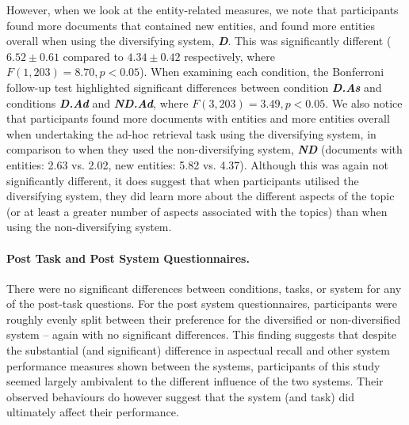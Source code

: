 However, when we look at the entity-related measures, we note that participants found more documents that contained new entities, and found more entities overall when using the diversifying system, \textbf{\emph{D}}. This was significantly different ($6.52\pm0.61$ compared to $4.34\pm0.42$ respectively, where $F(1, 203)=8.70, p<0.05$). When examining each condition, the Bonferroni follow-up test highlighted significant differences between condition \textbf{\emph{D.As}} and conditions \textbf{\emph{D.Ad}} and \textbf{\emph{ND.Ad}}, where $F(3, 203)=3.49, p<0.05$. We also notice that participants found more documents with entities and more entities overall when undertaking the ad-hoc retrieval task using the diversifying system, in comparison to when they used the non-diversifying system, \textbf{\emph{ND}} (documents with entities: 2.63 vs. 2.02, new entities: 5.82 vs. 4.37). Although this was again not significantly different, it does suggest that when participants utilised the diversifying system, they did learn more about the different aspects of the topic (or at least a greater number of aspects associated with the topics) than when using the non-diversifying system. 

\paragraph{Post Task and Post System Questionnaires.} There were no significant differences between conditions, tasks, or system for any of the post-task questions. For the post system questionnaires, participants were roughly evenly split between their preference for the diversified or non-diversified system -- again with no significant differences. This finding suggests that despite the substantial (and significant) difference in aspectual recall and other system performance measures shown between the systems, participants of this study seemed largely ambivalent to the different influence of the two systems. Their observed behaviours do however suggest that the system (and task) did ultimately affect their performance.

